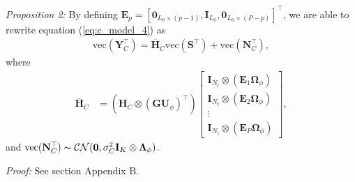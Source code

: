\documentclass[lettersize,journal]{IEEEtran}
\newcommand{\nocolor}[1]{{\color{black}#1}}
\begin{document}
\textit{Proposition 2:} By defining $\mathbf{E}_{p}=[\mathbf{0}_{L_0\times(p-1)},\mathbf{I}_{L_0},\mathbf{0}_{L_0\times(P-p)}]^{\top}$, we are able to rewrite equation (\ref{eq:c_model_4}) as
\begin{equation}
\begin{aligned}
    \text{vec}(\mathbf{Y}_C^{\top}) = \overline{\mathbf{H}}_C\text{vec}(\mathbf{S}^{\top}) + \text{vec}(\mathbf{N}_C^{\top}),
\end{aligned}
\end{equation}
where
\begin{equation}
\begin{aligned}
    \overline{\mathbf{H}}_C &= (\mathbf{H}_C\otimes(\mathbf{G}\mathbf{U}_{\phi})^{\top})
    \begin{bmatrix}
        \mathbf{I}_{N_t}\otimes(\mathbf{E}_{1}\mathbf{\Omega}_{\phi}) \\
        \mathbf{I}_{N_t}\otimes(\mathbf{E}_{2}\mathbf{\Omega}_{\phi}) \\
        \vdots \\
        \mathbf{I}_{N_t}\otimes(\mathbf{E}_{P}\mathbf{\Omega}_{\phi})
    \end{bmatrix},
\end{aligned}
\end{equation}
and $\text{vec}(\mathbf{N}_C^{\top})\thicksim\mathcal{CN}(\mathbf{0},\sigma_C^2\mathbf{I}_K\otimes\mathbf{\Lambda}_{\phi})$.

\textit{Proof:} \nocolor{See section Appendix B}.
\end{document}
